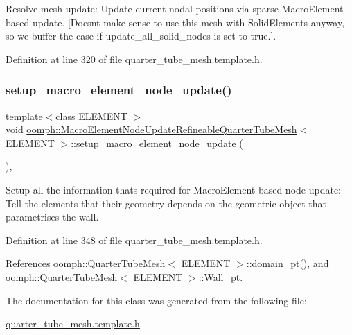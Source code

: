 Resolve mesh update\+: Update current nodal positions via sparse Macro\+Element-\/based update. \mbox{[}Doesn\textquotesingle{}t make sense to use this mesh with Solid\+Elements anyway, so we buffer the case if update\+\_\+all\+\_\+solid\+\_\+nodes is set to true.\mbox{]}. 



Definition at line 320 of file quarter\+\_\+tube\+\_\+mesh.\+template.\+h.

\mbox{\label{classoomph_1_1MacroElementNodeUpdateRefineableQuarterTubeMesh_ae98ab46cf2030928d805894dffe1b642}} 
\subsubsection{\texorpdfstring{setup\+\_\+macro\+\_\+element\+\_\+node\+\_\+update()}{setup\_macro\_element\_node\_update()}}
{\footnotesize\ttfamily template$<$class E\+L\+E\+M\+E\+NT $>$ \\
void \hyperlink{classoomph_1_1MacroElementNodeUpdateRefineableQuarterTubeMesh}{oomph\+::\+Macro\+Element\+Node\+Update\+Refineable\+Quarter\+Tube\+Mesh}$<$ E\+L\+E\+M\+E\+NT $>$\+::setup\+\_\+macro\+\_\+element\+\_\+node\+\_\+update (\begin{DoxyParamCaption}{ }\end{DoxyParamCaption})\hspace{0.3cm}{\ttfamily [inline]}, {\ttfamily [private]}}



Setup all the information that\textquotesingle{}s required for Macro\+Element-\/based node update\+: Tell the elements that their geometry depends on the geometric object that parametrises the wall. 



Definition at line 348 of file quarter\+\_\+tube\+\_\+mesh.\+template.\+h.



References oomph\+::\+Quarter\+Tube\+Mesh$<$ E\+L\+E\+M\+E\+N\+T $>$\+::domain\+\_\+pt(), and oomph\+::\+Quarter\+Tube\+Mesh$<$ E\+L\+E\+M\+E\+N\+T $>$\+::\+Wall\+\_\+pt.



The documentation for this class was generated from the following file\+:\begin{DoxyCompactItemize}
\item 
\hyperlink{quarter__tube__mesh_8template_8h}{quarter\+\_\+tube\+\_\+mesh.\+template.\+h}\end{DoxyCompactItemize}
